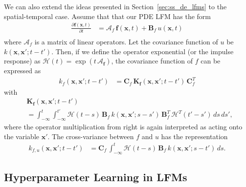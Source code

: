 \documentclass[journal]{IEEEtran}
\begin{document}
We can also extend the ideas presented in Section~\ref{sec:ss_de_lfms} to the spatial-temporal case.  Assume that that our PDE LFM has the form
%
\begin{equation}
\begin{split}
  \frac{\partial \mathbf{f}(\mathbf{x},t)}{\partial t}
  &= \mathbf{\mathcal{A}}_f \, \mathbf{f}(\mathbf{x},t) + \mathbf{B}_f \, u(\mathbf{x},t) \\
\end{split}
\end{equation}
%
where $\mathbf{\mathcal{A}}_f$ is a matrix of linear operators. Let the covariance function of $u$ be $k(\mathbf{x},\mathbf{x}';t - t')$. Then, if we define the operator exponential (or the impulse response) as $\mathbf{\mathcal{H}}(t) = \exp(t \, \mathbf{\mathcal{A}_f})$, the covariance function of $f$ can be expressed as
%
\begin{equation}
\begin{split}
  k_f(\mathbf{x},\mathbf{x}';t-t') &=
  \mathbf{C}_f \, \mathbf{K}_\mathbf{f}(\mathbf{x},\mathbf{x}';t-t') \, \mathbf{C}_f^T
\end{split}
\end{equation}
%
with
%
\begin{equation}
\begin{split}
  &\mathbf{K}_\mathbf{f}(\mathbf{x},\mathbf{x}';t-t')
  \\ &
  =
  \int_{-\infty}^{t} \int_{-\infty}^{t'}
  \mathbf{\mathcal{H}}(t - s) \, \mathbf{B}_f \, k(\mathbf{x},\mathbf{x}';s - s') \,
  \mathbf{B}_f^T \, \mathbf{\mathcal{H}}^T(t' - s') \, ds \, ds',
\end{split}
\label{eq:vfcov}
\end{equation}
%
where the operator multiplication from right is again interpreted as acting onto the variable $\mathbf{x}'$. The cross-variance between $f$ and $u$ has the representation
%
\begin{equation}
\begin{split}
  k_{f,u}(\mathbf{x},\mathbf{x}';t-t') &=
  \mathbf{C}_f \, 
  \int_{-\infty}^{t}
  \mathbf{\mathcal{H}}(t - s) \, \mathbf{B}_f \, k(\mathbf{x},\mathbf{x}';s - t') \, ds.
\end{split}
\end{equation}

\subsection{Hyperparameter Learning in LFMs}
\end{document}
